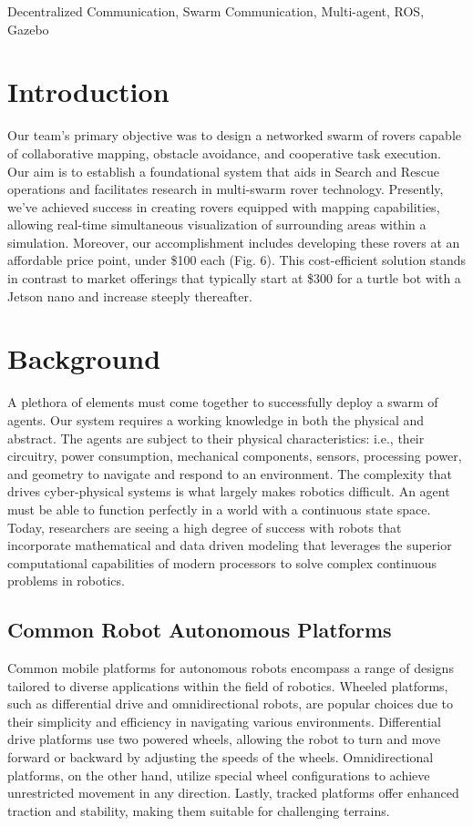 \documentclass[conference]{IEEEtran}
\begin{document}
\begin{IEEEkeywords}
Decentralized Communication, Swarm Communication, Multi-agent, ROS, Gazebo
\end{IEEEkeywords}

\section{Introduction}

Our team's primary objective was to design a networked swarm of rovers capable of collaborative mapping, obstacle avoidance, and cooperative task execution. Our aim is to establish a foundational system that aids in Search and Rescue operations and facilitates research in multi-swarm rover technology. Presently, we've achieved success in creating rovers equipped with mapping capabilities, allowing real-time simultaneous visualization of surrounding areas within a simulation. Moreover, our accomplishment includes developing these rovers at an affordable price point, under \$100 each (Fig. 6). This cost-efficient solution stands in contrast to market offerings that typically start at \$300 for a turtle bot with a Jetson nano and increase steeply thereafter.


\section{Background} 
A plethora of elements must come together to successfully deploy a swarm of agents. Our system requires a working knowledge in both the physical and abstract. The agents are subject to their physical characteristics: i.e., their circuitry, power consumption, mechanical components, sensors, processing power, and geometry to navigate and respond to an environment. The complexity that drives cyber-physical systems is what largely makes robotics difficult. An agent must be able to function perfectly in a world with a continuous state space. Today, researchers are seeing a high degree of success with robots that incorporate mathematical and data driven modeling that leverages the superior computational capabilities of modern processors to solve complex continuous problems in robotics. 
\subsection{Common Robot Autonomous Platforms} Common mobile platforms for autonomous robots encompass a range of designs tailored to diverse applications within the field of robotics. Wheeled platforms, such as differential drive and omnidirectional robots, are popular choices due to their simplicity and efficiency in navigating various environments. Differential drive platforms use two powered wheels, allowing the robot to turn and move forward or backward by adjusting the speeds of the wheels. Omnidirectional platforms, on the other hand, utilize special wheel configurations to achieve unrestricted movement in any direction. Lastly, tracked platforms offer enhanced traction and stability, making them suitable for challenging terrains.
\end{document}
